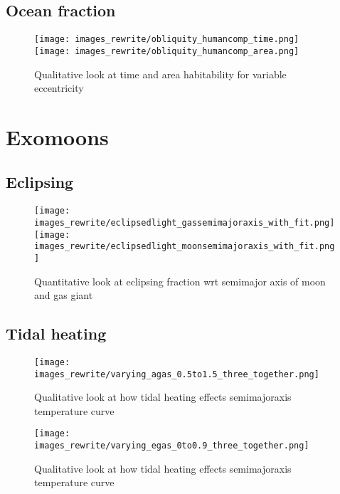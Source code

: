 \documentclass[12pt, onecolumn]{revtex4-2}    %
\begin{document}
\subsection{Ocean fraction} \label{ssec:qualitative_oceanfraction}
\begin{figure}
  \texttt{[image: images\_rewrite/obliquity\_humancomp\_time.png]}
  \texttt{[image: images\_rewrite/obliquity\_humancomp\_area.png]}
  \caption{
    Qualitative look at time and area habitability for variable eccentricity
  }
  \label{fig:qualitative_oceanfraction}
\end{figure}

\section{Exomoons} \label{sec:Exomoons}
\subsection{Eclipsing} \label{ssec:InvEclipsing}
\begin{figure}
  \texttt{[image: images\_rewrite/eclipsedlight\_gassemimajoraxis\_with\_fit.png]}
  \texttt{[image: images\_rewrite/eclipsedlight\_moonsemimajoraxis\_with\_fit.png]}
  \caption{
    Quantitative look at eclipsing fraction wrt semimajor axis of moon and gas giant
  }
  \label{fig:quantitative_eclipsing}
\end{figure}
\subsection{Tidal heating} \label{ssec:InvTidalHeating}
\begin{figure}
  \texttt{[image: images\_rewrite/varying\_agas\_0.5to1.5\_three\_together.png]}
  \caption{
    Qualitative look at how tidal heating effects semimajoraxis temperature curve
  }
  \label{fig:qualitative_tidalheating_semimajoraxis}
\end{figure}

\begin{figure}
  \texttt{[image: images\_rewrite/varying\_egas\_0to0.9\_three\_together.png]}
  \caption{
    Qualitative look at how tidal heating effects semimajoraxis temperature curve
  }
  \label{fig:qualitative_tidalheating_eccentrcity}
\end{figure}
\end{document}
